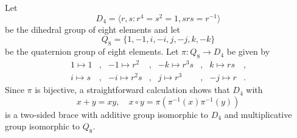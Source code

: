 \begin{example}
	\label{exa:d8q8}
	Let 
	\[
	D_4=\langle r,s:r^4=s^2=1,srs=r^{-1}\rangle
	\]
	be the dihedral group of eight elements and let
	\[
	Q_8=\{1,-1,i,-i,j,-j,k,-k\}
	\]
	be the quaternion group of eight elements.  Let
	$\pi:Q_8\to D_4$ be given by 
	\begin{align*}
		1\mapsto 1 &, & -1\mapsto r^2 &,  & -k\mapsto r^3s &,&  k\mapsto rs &,\\
		i\mapsto s &, & -i\mapsto r^2s &, &  j\mapsto r^3 &, & -j\mapsto r &.
	\end{align*}
	Since $\pi$ is bijective, 
	a straightforward calculation shows that $D_4$ with 
	\[
	  x+y=xy,\quad 
	  x\circ y=\pi(\pi^{-1}(x)\pi^{-1}(y))
	\]
	is a two-sided brace with additive group isomorphic to $D_4$ and multiplicative group
	isomorphic to $Q_8$. 
\end{example}





